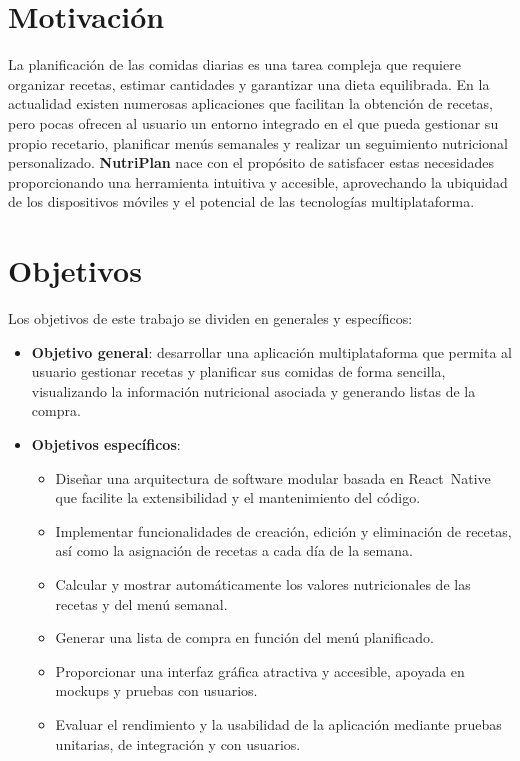 \documentclass[twoside, openright, 11pt]{report}
\begin{document}
\section{Motivación}
La planificación de las comidas diarias es una tarea compleja que requiere organizar recetas, estimar cantidades y garantizar una dieta equilibrada. En la actualidad existen numerosas aplicaciones que facilitan la obtención de recetas, pero pocas ofrecen al usuario un entorno integrado en el que pueda gestionar su propio recetario, planificar menús semanales y realizar un seguimiento nutricional personalizado. \textbf{NutriPlan} nace con el propósito de satisfacer estas necesidades proporcionando una herramienta intuitiva y accesible, aprovechando la ubiquidad de los dispositivos móviles y el potencial de las tecnologías multiplataforma.

\section{Objetivos}
Los objetivos de este trabajo se dividen en generales y específicos:
\begin{itemize}
  \item \textbf{Objetivo general}: desarrollar una aplicación multiplataforma que permita al usuario gestionar recetas y planificar sus comidas de forma sencilla, visualizando la información nutricional asociada y generando listas de la compra.
  \item \textbf{Objetivos específicos}: 
  \begin{itemize}
    \item Diseñar una arquitectura de software modular basada en React Native que facilite la extensibilidad y el mantenimiento del código.
    \item Implementar funcionalidades de creación, edición y eliminación de recetas, así como la asignación de recetas a cada día de la semana.
    \item Calcular y mostrar automáticamente los valores nutricionales de las recetas y del menú semanal.
    \item Generar una lista de compra en función del menú planificado.
    \item Proporcionar una interfaz gráfica atractiva y accesible, apoyada en mockups y pruebas con usuarios.
    \item Evaluar el rendimiento y la usabilidad de la aplicación mediante pruebas unitarias, de integración y con usuarios.
  \end{itemize}
\end{itemize}
\end{document}
